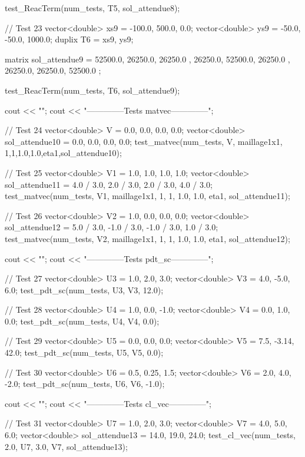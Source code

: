 \begin{codeblock}
{    test_ReacTerm(num_tests, T5, sol_attendue8);


    // Test 23
    vector<double> xs9 = {-100.0, 500.0, 0.0};
    vector<double> ys9 = {-50.0, -50.0, 1000.0};
    duplix T6 = {xs9, ys9};

    matrix sol_attendue9 = {
        { 52500.0, 26250.0, 26250.0 },
        { 26250.0, 52500.0, 26250.0 },
        { 26250.0, 26250.0, 52500.0 }
    };

    test_ReacTerm(num_tests, T6, sol_attendue9);


    cout << "\n\n\n";
    cout << "--------------Tests matvec--------------\n";

    // Test 24
    vector<double> V = {0.0, 0.0, 0.0, 0.0};
    vector<double> sol_attendue10 = {0.0, 0.0, 0.0, 0.0};
    test_matvec(num_tests, V, maillage1x1, 1,1,1.0,1.0,eta1,sol_attendue10);


    // Test 25
    vector<double> V1 = {1.0, 1.0, 1.0, 1.0};
    vector<double> sol_attendue11 = {4.0 / 3.0, 2.0 / 3.0, 2.0 / 3.0, 4.0 / 3.0};
    test_matvec(num_tests, V1, maillage1x1, 1, 1, 1.0, 1.0, eta1, sol_attendue11);

    // Test 26
    vector<double> V2 = {1.0, 0.0, 0.0, 0.0};
    vector<double> sol_attendue12 = {5.0 / 3.0, -1.0 / 3.0, -1.0 / 3.0, 1.0 / 3.0};
    test_matvec(num_tests, V2, maillage1x1, 1, 1, 1.0, 1.0, eta1, sol_attendue12);


    cout << "\n\n\n";
    cout << "--------------Tests pdt_sc--------------\n";

    // Test 27
    vector<double> U3 = {1.0, 2.0, 3.0};
    vector<double> V3 = {4.0, -5.0, 6.0};
    test_pdt_sc(num_tests, U3, V3, 12.0);


    // Test 28
    vector<double> U4 = {1.0, 0.0, -1.0};
    vector<double> V4 = {0.0, 1.0, 0.0};
    test_pdt_sc(num_tests, U4, V4, 0.0);

    // Test 29
    vector<double> U5 = {0.0, 0.0, 0.0};
    vector<double> V5 = {7.5, -3.14, 42.0};
    test_pdt_sc(num_tests, U5, V5, 0.0);

    // Test 30
    vector<double> U6 = {0.5, 0.25, 1.5};
    vector<double> V6 = {2.0, 4.0, -2.0};
    test_pdt_sc(num_tests, U6, V6, -1.0);


    cout << "\n\n\n";
    cout << "--------------Tests cl_vec--------------\n";

    // Test 31
    vector<double> U7 = {1.0, 2.0, 3.0};
    vector<double> V7 = {4.0, 5.0, 6.0};
    vector<double> sol_attendue13 = {14.0, 19.0, 24.0};
    test_cl_vec(num_tests, 2.0, U7, 3.0, V7, sol_attendue13);

}
\end{codeblock}
